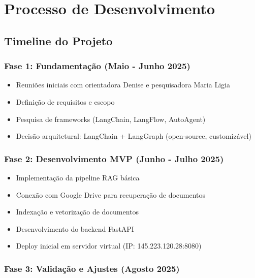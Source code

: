 \documentclass[12pt,a4paper]{report}
\begin{document}
\newpage

\chapter{Processo de Desenvolvimento}

\section{Timeline do Projeto}

\subsection{Fase 1: Fundamentação (Maio - Junho 2025)}

\begin{itemize}
  \item Reuniões iniciais com orientadora Denise e pesquisadora Maria Ligia
  \item Definição de requisitos e escopo
  \item Pesquisa de frameworks (LangChain, LangFlow, AutoAgent)
  \item Decisão arquitetural: LangChain + LangGraph (open-source, customizável)
\end{itemize}

\subsection{Fase 2: Desenvolvimento MVP (Junho - Julho 2025)}

\begin{itemize}
  \item Implementação da pipeline RAG básica
  \item Conexão com Google Drive para recuperação de documentos
  \item Indexação e vetorização de documentos
  \item Desenvolvimento do backend FastAPI
  \item Deploy inicial em servidor virtual (IP: 145.223.120.28:8080)
\end{itemize}

\subsection{Fase 3: Validação e Ajustes (Agosto 2025)}
\end{document}
